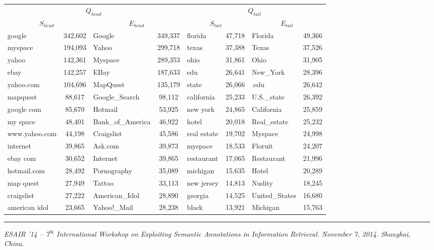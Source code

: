 \documentclass[a0,portrait,final]{a0poster}
\newcommand{\tail}[1]{$Q_{tail}${}}
\newcommand{\head}[1]{$Q_{head}${}}
\newcommand{\stail}[1]{$S_{tail}${}}
\newcommand{\shead}[1]{$S_{head}${}}
\newcommand{\etail}[1]{$E_{tail}${}}
\newcommand{\ehead}[1]{$E_{head}${}}
\begin{document}
\begin{multicols}{2}
\begin{tabular}{lc|lc|lc|lc}
\toprule
\multicolumn{4}{c}{\head{}} & \multicolumn{4}{c}{\tail{}}\\
\multicolumn{2}{c}{\shead{}} & \multicolumn{2}{c}{\ehead{}} & \multicolumn{2}{c}{\stail{}} & \multicolumn{2}{c}{\etail{}}\\
\midrule
google         & 342,602  &  Google  		   & 349,337  &  florida 	 &	47,718	&	Florida 		& 49,366 \\
myspace        & 194,093  &  Yahoo\!  		   & 299,718  &  texas  	 &	 37,388  &   Texas   		& 37,526 \\
yahoo          & 142,361  &  Myspace 		   & 289,353  &  ohio    	 &	31,861   &   Ohio    		& 31,905 \\			
ebay           & 142,257  &   EBay   		   & 187,633  &  edu     	 &	26,641   &   New\_York        & 28,396 \\
yahoo.com      & 104,696  &  MapQuest          & 135,179  &  state   	 &	26,066   &   .edu    		& 26,642 \\
mapquest       & 88,617   &  Google\_Search     & 98,112   &  california  &   25,233  &   U.S.\_state      & 26,392 \\
google com     & 85,670   &  Hotmail           & 53,925   &  new york    &   24,865  &   California      & 25,859 \\
my space       & 48,401   &	  Bank\_of\_America  & 46,922   &  hotel   	 &	20,018   &   Real\_estate     & 25,232 \\
www.yahoo.com  & 44,198   &  Craigslist        & 45,586   &  real estate &   19,702  &   Myspace 		& 24,998 \\
internet       & 39,865   &  Ask.com           & 39,873   &  myspace 	 &	18,533   &   Floruit 		& 24,207 \\
ebay com       & 30,652   &  Internet          & 39,865   &  restaurant  &  17,065   &   Restaurant      & 21,996 \\
hotmail.com    & 28,492   &  Pornography       & 35,089   &  michigan    &   15,635  &   Hotel   		& 20,289 \\
map quest      & 27,949   &  Tattoo            & 33,113   &  new jersey  &   14,813  &   Nudity  		& 18,245 \\
craigslist     & 27,222   &  American\_Idol     & 28,890   &  georgia 	 &	14,525   &   United\_States   & 16,680 \\
american idol  & 23,665   &  Yahoo!\_Mail       & 28,238   &  black   	 &	13,921   &   Michigan        & 15,763 \\
\bottomrule
\end{tabular}



\end{multicols}
\vfill
\centering
\begin{minipage}[c]{\textwidth}
\rule{\textwidth}{1pt}
\textit{ESAIR '14  -- 7$^\textit{th}$ International Workshop on Exploiting Semantic Annotations in Information Retrieval. November 7, 2014. Shanghai, China.}
\end{minipage}
\end{document}
